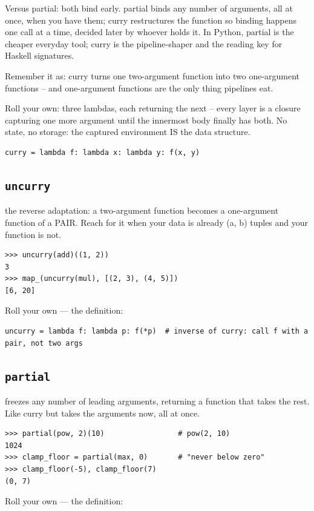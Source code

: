 \documentclass[10pt,letterpaper]{book}
\begin{document}
Versus partial: both bind early. partial binds any number of arguments, all at once, when you have them; curry restructures the function so binding happens one call at a time, decided later by whoever holds it. In Python, partial is the cheaper everyday tool; curry is the pipeline-shaper and the reading key for Haskell signatures.


Remember it as: curry turns one two-argument function into two one-argument functions -- and one-argument functions are the only thing pipelines eat.


Roll your own: three lambdas, each returning the next -- every layer is a closure capturing one more argument until the innermost body finally has both. No state, no storage: the captured environment IS the data structure.

\begin{lstlisting}[style=ex]
curry = lambda f: lambda x: lambda y: f(x, y)
\end{lstlisting}
\subsection{\texttt{uncurry}}\label{def:uncurry}
the reverse adaptation: a two-argument function becomes a one-argument function of a PAIR. Reach for it when your data is already (a, b) tuples and your function is not.
\begin{lstlisting}[style=ex]
>>> uncurry(add)((1, 2))
3
>>> map_(uncurry(mul), [(2, 3), (4, 5)])
[6, 20]
\end{lstlisting}

Roll your own --- the definition:

\begin{lstlisting}[style=ex]
uncurry = lambda f: lambda p: f(*p)  # inverse of curry: call f with a pair, not two args
\end{lstlisting}
\subsection{\texttt{partial}}\label{def:partial}
freezes any number of leading arguments, returning a function that takes the rest. Like curry but takes the arguments now, all at once.
\begin{lstlisting}[style=ex]
>>> partial(pow, 2)(10)                 # pow(2, 10)
1024
>>> clamp_floor = partial(max, 0)       # "never below zero"
>>> clamp_floor(-5), clamp_floor(7)
(0, 7)
\end{lstlisting}

Roll your own --- the definition:
\end{document}
